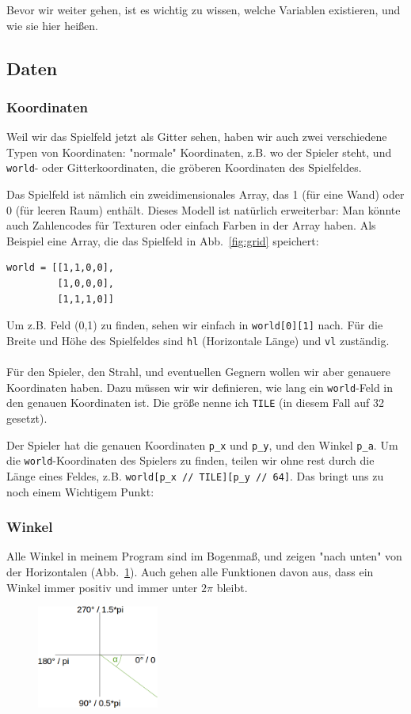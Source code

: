 \documentclass[a4paper,12pt]{report}
\begin{document}
Bevor wir weiter gehen, ist es wichtig zu wissen, welche Variablen existieren, und wie sie hier heißen.

\subsection{Daten}
\subsubsection{Koordinaten}
Weil wir das Spielfeld jetzt als Gitter sehen, haben wir auch zwei verschiedene Typen von Koordinaten: "normale" Koordinaten, z.B. wo der Spieler steht, und \texttt{world}- oder Gitterkoordinaten, die gröberen Koordinaten des Spielfeldes.

Das Spielfeld ist nämlich ein zweidimensionales Array, das 1 (für eine Wand) oder 0 (für leeren Raum) enthält. Dieses Modell ist natürlich erweiterbar: Man könnte auch Zahlencodes für Texturen oder einfach Farben in der Array haben. Als Beispiel eine Array, die das Spielfeld in Abb.~\ref{fig:grid} speichert:
\begin{Verbatim}[baselinestretch=1.0, xleftmargin=1cm]
world = [[1,1,0,0],
         [1,0,0,0],
         [1,1,1,0]]
\end{Verbatim}
Um z.B. Feld (0,1) zu finden, sehen wir einfach in \texttt{world[0][1]} nach. Für die Breite und Höhe des Spielfeldes sind \texttt{hl} (Horizontale Länge) und \texttt{vl} zuständig. 
\paragraph*{}
Für den Spieler, den Strahl, und eventuellen Gegnern wollen wir aber genauere Koordinaten haben. Dazu müssen wir wir definieren, wie lang ein \texttt{world}-Feld in den genauen Koordinaten ist. Die größe nenne ich \texttt{TILE} (in diesem Fall auf 32 gesetzt).

Der Spieler hat die genauen Koordinaten \texttt{p\_x} und \texttt{p\_y}, und den Winkel \texttt{p\_a}. Um die \texttt{world}-Koordinaten des Spielers zu finden, teilen wir ohne rest durch die Länge eines Feldes, z.B. \texttt{world[p\_x // TILE][p\_y // 64]}. Das bringt uns zu noch einem Wichtigem Punkt:

\subsubsection{Winkel}
Alle Winkel in meinem Program sind im Bogenmaß, und zeigen "nach unten" von der Horizontalen (Abb.~\ref{fig:angles}). Auch gehen alle Funktionen davon aus, dass ein Winkel immer positiv und immer unter $2\pi$ bleibt.
\begin{figure}[htbp] 
        \centering
        \includegraphics[width=4cm]{angles.png} 
        \label{fig:angles}
\end{figure}
\end{document}
